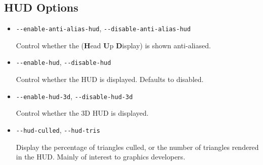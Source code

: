 \subsection{HUD Options}
\begin{itemize}
\item{\texttt{-$ $-enable-anti-alias-hud}, \texttt{-$ $-disable-anti-alias-hud}}

Control whether the  (\textbf{H}ead \textbf{U}p  \textbf{D}isplay) is shown anti-aliased.

\item{\texttt{-$ $-enable-hud}, \texttt{-$ $-disable-hud}}

Control whether the HUD is displayed. Defaults to disabled.

\item{\texttt{-$ $-enable-hud-3d}, \texttt{-$ $-disable-hud-3d}}

Control whether the 3D HUD is displayed.

\item{\texttt{-$ $-hud-culled}, \texttt{-$ $-hud-tris}}

Display the percentage of triangles culled, or the number of triangles rendered in the HUD. Mainly
of interest to graphics developers.

\end{itemize}

